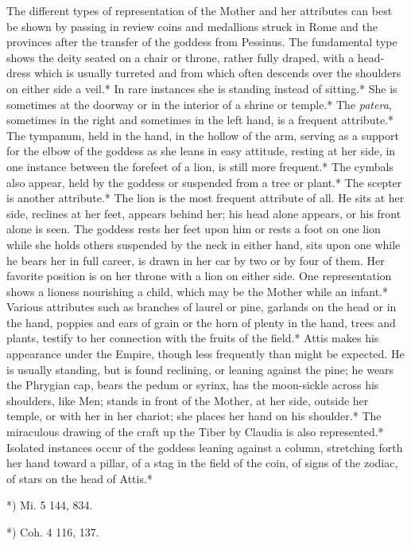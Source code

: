 \documentclass[a4paper, 11pt, oneside, polutonikogreek, english]{article}
\begin{document}
The different types of representation of the Mother and her attributes can best be shown by passing in review coins and medallions struck in Rome and the provinces after the transfer of the goddess from Pessinus. The fundamental type shows the deity seated on a chair or throne, rather fully draped, with a head-dress which is usually turreted and from which often descends over the shoulders on either side a veil.* In rare instances she is standing instead of sitting.* She is sometimes at the doorway or in the interior of a shrine or temple.* The \emph{patera}, sometimes in the right and sometimes in the left hand, is a frequent attribute.* The tympanum, held in the hand, in the hollow of the arm, serving as a support for the elbow of the goddess as she leans in easy attitude, resting at her side, in one instance between the forefeet of a lion, is still more frequent.* The cymbals also appear, held by the goddess or suspended from a tree or plant.* The scepter is another attribute.* The lion is the most frequent attribute of all. He sits at her side, reclines at her feet, appears behind her; his head alone appears, or his front alone is seen. The goddess rests her feet upon him or rests a foot on one lion while she holds others suspended by the neck in either hand, sits upon one while he bears her in full career, is drawn in her car by two or by four of them. Her favorite position is on her throne with a lion on either side. One representation shows a lioness nourishing a child, which may be the Mother while an infant.* Various attributes such as branches of laurel or pine, garlands on the head or in the hand, poppies and ears of grain or the horn of plenty in the hand, trees and plants, testify to her connection with the fruits of the field.* Attis makes his appearance under the Empire, though less frequently than might be expected. He is usually standing, but is found reclining, or leaning against the pine; he wears the Phrygian cap, bears the pedum or syrinx, has the moon-sickle across his shoulders, like Men; stands in front of the Mother, at her side, outside her temple, or with her in her chariot; she places her hand on his shoulder.* The miraculous drawing of the craft up the Tiber by Claudia is also represented.* Isolated instances occur of the goddess leaning against a column, stretching forth her hand toward a pillar, of a stag in the field of the coin, of signs of the zodiac, of stars on the head of Attis.*

*) Mi. 5 144, 834.

*) Coh. 4 116, 137.
\end{document}
